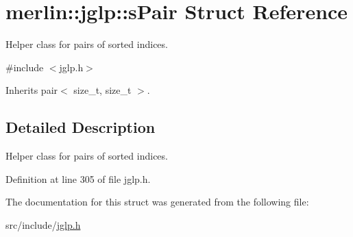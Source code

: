 \hypertarget{structmerlin_1_1jglp_1_1sPair}{}\section{merlin\+:\+:jglp\+:\+:s\+Pair Struct Reference}
\label{structmerlin_1_1jglp_1_1sPair}


Helper class for pairs of sorted indices.  




{\ttfamily \#include $<$jglp.\+h$>$}



Inherits pair$<$ size\+\_\+t, size\+\_\+t $>$.



\subsection{Detailed Description}
Helper class for pairs of sorted indices. 

Definition at line 305 of file jglp.\+h.



The documentation for this struct was generated from the following file\+:\begin{DoxyCompactItemize}
\item 
src/include/\hyperlink{jglp_8h}{jglp.\+h}\end{DoxyCompactItemize}

